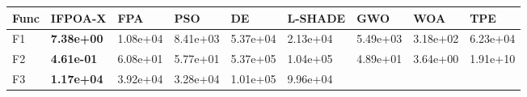 \documentclass[
  9pt,
]{extarticle}
\newcounter{none} %
\begin{document}
{\def\LTcaptype{none} %
\begin{longtable}[]{@{}
  >{\raggedright\arraybackslash}p{}
  >{\raggedright\arraybackslash}p{}
  >{\raggedright\arraybackslash}p{}
  >{\raggedright\arraybackslash}p{}
  >{\raggedright\arraybackslash}p{}
  >{\raggedright\arraybackslash}p{}
  >{\raggedright\arraybackslash}p{}
  >{\raggedright\arraybackslash}p{}
  >{\raggedright\arraybackslash}p{}@{}}
\toprule\noalign{}
\begin{minipage}[b]{\linewidth}\raggedright
Func
\end{minipage} & \begin{minipage}[b]{\linewidth}\raggedright
IFPOA-X
\end{minipage} & \begin{minipage}[b]{\linewidth}\raggedright
FPA
\end{minipage} & \begin{minipage}[b]{\linewidth}\raggedright
PSO
\end{minipage} & \begin{minipage}[b]{\linewidth}\raggedright
DE
\end{minipage} & \begin{minipage}[b]{\linewidth}\raggedright
L-SHADE
\end{minipage} & \begin{minipage}[b]{\linewidth}\raggedright
GWO
\end{minipage} & \begin{minipage}[b]{\linewidth}\raggedright
WOA
\end{minipage} & \begin{minipage}[b]{\linewidth}\raggedright
TPE
\end{minipage} \\
\midrule\noalign{}
\endhead
\bottomrule\noalign{}
\endlastfoot
F1 & \textbf{7.38e+00} & 1.08e+04 & 8.41e+03 & 5.37e+04 & 2.13e+04 &
5.49e+03 & 3.18e+02 & 6.23e+04 \\
F2 & \textbf{4.61e-01} & 6.08e+01 & 5.77e+01 & 5.37e+05 & 1.04e+05 &
4.89e+01 & 3.64e+00 & 1.91e+10 \\
F3 & \textbf{1.17e+04} & 3.92e+04 & 3.28e+04 & 1.01e+05 & 9.96e+04 &

\end{longtable}}
\end{document}
